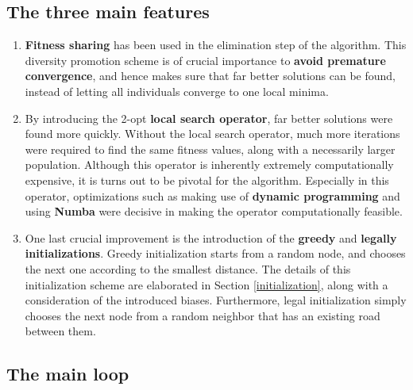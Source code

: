 \documentclass[a4paper,10pt]{article}
\newcommand{\ReplaceMe}[1]{{\color{blue}#1}}
\begin{document}
\subsection{The three main features}
\begin{enumerate}
\item \textbf{Fitness sharing} has been used in the elimination step of the algorithm. This diversity promotion scheme is of crucial importance to \textbf{avoid premature convergence}, and hence makes sure that far better solutions can be found, instead of letting all individuals converge to one local minima.
\item By introducing the 2-opt \textbf{local search operator}, far better solutions were found more quickly. Without the local search operator, much more iterations were required to find the same fitness values, along with a necessarily larger population. Although this operator is inherently extremely computationally expensive, it is turns out to be pivotal for the algorithm. Especially in this operator, optimizations such as making use of \textbf{dynamic programming} and using \textbf{Numba} were decisive in making the operator computationally feasible.
\item One last crucial improvement is the introduction of the \textbf{greedy} and \textbf{legally initializations}. Greedy initialization starts from a random node, and chooses the next one according to the smallest distance. The details of this initialization scheme are elaborated in Section \ref{initialization}, along with a consideration of the introduced biases. Furthermore, legal initialization simply chooses the next node from a random neighbor that has an existing road between them.
\end{enumerate}

\subsection{The main loop}

\end{document}
